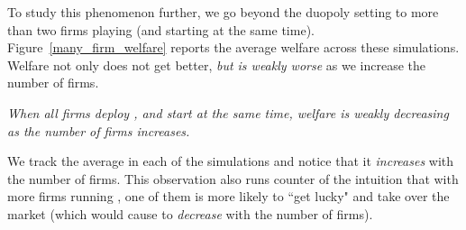 \documentclass[../competing_bandits_with_appendix.tex]{subfiles}
\begin{document}
To study this phenomenon further, we go beyond the duopoly setting to more than two firms playing \DynamicGreedy (and starting at the same time). Figure~\ref{many_firm_welfare} reports the average welfare
across these simulations. Welfare not only does not get better, \textit{but is weakly worse} as we increase the number of firms.

\begin{finding}
\textit{When all firms deploy \DynamicGreedy, and start at the same time, welfare is weakly decreasing as the number of firms increases.}
\end{finding}


We track the average \Eeog in each of the
simulations and notice that it \textit{increases} with the number of firms.
This observation also runs counter of the intuition that with more firms running \DynamicGreedy, one of them is more likely to ``get lucky" and take over the market (which would cause \Eeog to \emph{decrease} with the number of firms).
\end{document}
